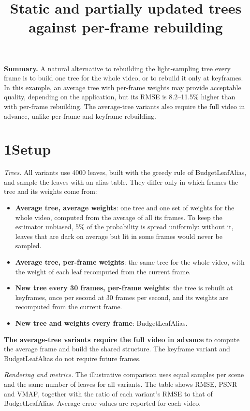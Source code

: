 \documentclass[10pt]{article}
\title{\vspace{-1.6em}Static and partially updated trees against per-frame rebuilding}
\author{}
\date{\vspace{-2.4em}}
\begin{document}
\maketitle
\vspace{-1.0em}

\textbf{Summary.} A natural alternative to rebuilding the light-sampling tree every frame is to build one tree for the whole video, or to rebuild it only at keyframes. In this example, an average tree with per-frame weights may provide acceptable quality, depending on the application, but its RMSE is 8.2--11.5\% higher than with per-frame rebuilding. The average-tree variants also require the full video in advance, unlike per-frame and keyframe rebuilding.

\section*{1\quad Setup}

\emph{Trees.} All variants use 4000 leaves, built with the greedy rule of BudgetLeafAlias, and sample the leaves with an alias table. They differ only in which frames the tree and its weights come from:
\begin{itemize}\setlength{\itemsep}{0pt}
\item \textbf{Average tree, average weights}: one tree and one set of weights for the whole video, computed from the average of all its frames. To keep the estimator unbiased, 5\% of the probability is spread uniformly: without it, leaves that are dark on average but lit in some frames would never be sampled.
\item \textbf{Average tree, per-frame weights}: the same tree for the whole video, with the weight of each leaf recomputed from the current frame.
\item \textbf{New tree every 30 frames, per-frame weights}: the tree is rebuilt at keyframes, once per second at 30 frames per second, and its weights are recomputed from the current frame.
\item \textbf{New tree and weights every frame}: BudgetLeafAlias.
\end{itemize}
\textbf{The average-tree variants require the full video in advance} to compute the average frame and build the shared structure. The keyframe variant and BudgetLeafAlias do not require future frames.

\emph{Rendering and metrics.} The illustrative comparison uses equal samples per scene and the same number of leaves for all variants. The table shows RMSE, PSNR and VMAF, together with the ratio of each variant's RMSE to that of BudgetLeafAlias.  Average error values are reported for each video.
\end{document}
